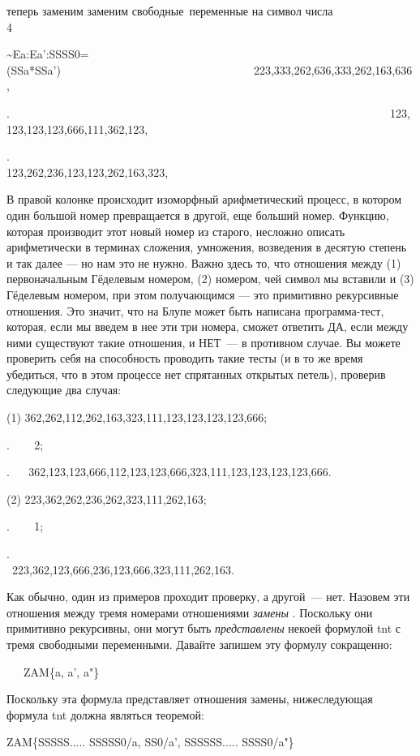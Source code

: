 \documentclass[../main.tex]{subfiles}
\begin{document}
теперь заменим заменим свободные~переменные на символ числа 4~~~~~~~~~~~~~~~~~~~~~~

\textasciitilde Ea:Ea':SSSS0=(SSa*SSa')~~~~~~~~~~~~~~~~~~~~~~~~~~~~~~~~~~223,333,262,636,333,262,163,636,

.~~~~~~~~~~~~~~~~~~~~~~~~~~~~~~~~~~~~~~~~~~~~~~~~~~~~~~~~~~~~~~~~~~~123,123,123,123,666,111,362,123,

.~~~~~~~~~~~~~~~~~~~~~~~~~~~~~~~~~~~~~~~~~~~~~~~~~~~~~~~~~~~~~~~~~~ 123,262,236,123,123,262,163,323,

В правой колонке происходит изоморфный арифметический процесс, в котором один большой номер превращается в другой, еще больший номер. Функцию, которая производит этот новый номер из старого, несложно описать арифметически в терминах сложения, умножения, возведения в десятую степень и так далее --- но нам это не нужно. Важно здесь то, что отношения между (1) первоначальным Гёделевым номером, (2) номером, чей символ мы вставили и (3) Гёделевым номером, при этом получающимся --- это примитивно рекурсивные отношения. Это значит, что на Блупе может быть написана программа-тест, которая, если мы введем в нее эти три номера, сможет ответить ДА, если между ними существуют такие отношения, и НЕТ~--- в противном случае. Вы можете проверить себя на способность проводить такие тесты (и в то же время убедиться, что в этом процессе нет спрятанных открытых петель), проверив следующие два случая:

(1) 362,262,112,262,163,323,111,123,123,123,123,666;

.~ ~ ~2;

. ~ ~362,123,123,666,112,123,123,666,323,111,123,123,123,123,666.

(2) 223,362,262,236,262,323,111,262,163;

.~ ~ ~1;

.~ ~ ~223,362,123,666,236,123,666,323,111,262,163.~~~~~~~~~~~~~~~~~~~~~~~~~~~~

Как обычно, один из примеров проходит проверку, а другой~--- нет. Назовем эти отношения между тремя номерами отношениями \emph{замены} . Поскольку они примитивно рекурсивны, они могут быть \emph{представлены} некоей формулой \acs{tnt} с тремя свободными переменными. Давайте запишем эту формулу сокращенно:

~~~ZAM\{a, a', a"\}

Поскольку эта формула представляет отношения замены, нижеследующая формула \acs{tnt} должна являться теоремой:

ZAM\{SSSSS..... SSSSS0/a, SS0/a', SSSSSS..... SSSS0/a"\}
\end{document}
